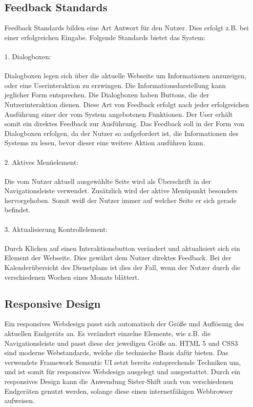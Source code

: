 \documentclass[11pt,
paper=a4,
bibtotocnumbered,	  %
liststotocnumbered,  %
DIV=calc,		  %
tablecaptionabove,	  %
headinclude,
]{article}
\begin{document}
\subsection{Feedback Standards}
Feedback Standards bilden eine Art Antwort für den Nutzer. Dies erfolgt z.B. bei einer erfolgreichen Eingabe. Folgende Standards bietet das System:\\\\
1. Dialogboxen:\\\\
Dialogboxen legen sich über die aktuelle Webseite um Informationen anzuzeigen, oder eine Userinteraktion zu erzwingen. Die Informationsdarstellung kann jeglicher Form entsprechen. Die Dialogboxen haben Buttons, die der Nutzerinteraktion dienen. Diese Art von Feedback erfolgt nach jeder erfolgreichen Ausführung einer der vom System angebotenen Funktionen. Der User erhält somit ein direktes Feedback zur Ausführung. Das Feedback soll in der Form von Dialogboxen erfolgen, da der Nutzer so aufgefordert ist, die Informationen des Systems zu lesen, bevor dieser eine weitere Aktion ausführen kann.\\\\
2. Aktives Menüelement:\\\\
Die vom Nutzer aktuell ausgewählte Seite wird als Überschrift in der Navigationsleiste verwendet. Zusätzlich wird der aktive Menüpunkt besonders hervorgehoben. Somit weiß der Nutzer immer auf welcher Seite er sich gerade befindet.\\\\
3. Aktualisierung Kontrollelement:\\\\
Durch Klicken auf einen Interaktionsbutton verändert und aktualisiert sich ein Element der Webseite. Dies gewährt dem Nutzer direktes Feedback. Bei der Kalenderübersicht des Dienstplans ist dies der Fall, wenn der Nutzer durch die verschiedenen Wochen eines Monats blättert.
\subsection{Responsive Design}
Ein responsives Webdesign passt sich automatisch der Größe und Auflösung des aktuellen Endgeräts an. Es verändert einzelne Elemente, wie z.B. die Navigationsleiste und passt diese der jeweiligen Größe an. HTML 5 und CSS3 sind moderne Webstandards, welche die technische Basis dafür bieten. Das verwendete Framework Sementic UI setzt bereits entsprechende Techniken um, und ist somit für responsives Webdesign ausgelegt und ausgestattet. Durch ein responsives Design kann die Anwendung Sister-Shift auch von verschiedenen Endgeräten genutzt werden, solange diese einen internetfähigen Webbrowser aufweisen.
\end{document}
